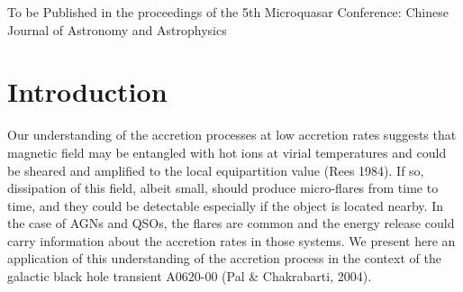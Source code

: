 \documentclass[referee]{cjaa}           %
\begin{document}

   \maketitle

\noindent To be Published in the proceedings of the 5th Microquasar Conference: 
Chinese Journal of Astronomy and Astrophysics


%
%
\section{Introduction}           %
\label{sect:intro}

Our understanding of the accretion processes at low accretion rates suggests that 
magnetic field may be entangled with hot ions at virial temperatures 
and could be sheared and amplified to the local equipartition
value (Rees 1984). If so, dissipation of this field, albeit small, should produce
micro-flares from time to time, and they could be detectable especially 
if the object is located nearby. In the case of AGNs and QSOs, the flares are common
and the energy release could carry information about the accretion rates in those
systems. We present here an application of this understanding of the accretion process
in the context of the galactic black hole transient A0620-00 (Pal \& Chakrabarti, 2004).
\end{document}
